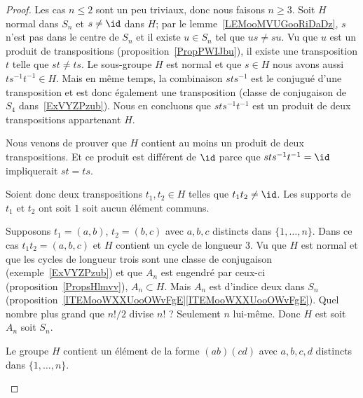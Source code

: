 \begin{proof}
    Les cas \( n\leq 2\) sont un peu triviaux, donc nous faisons \( n\geq 3\). Soit \( H\) normal dans \( S_n\) et \( s\neq \id\) dans \( H\); par le lemme~\ref{LEMooMVUGooRiDaDz}, \( s\) n'est pas dans le centre de \( S_n\) et il existe \( u\in S_n\) tel que \( us\neq su\). Vu que \( u\) est un produit de transpositions (proposition~\ref{PropPWIJbu}), il existe une transposition \( t\) telle que \( st\neq ts\). Le sous-groupe \( H\) est normal et que \( s\in H\) nous avons aussi \( ts^{-1}t^{-1}\in H\). Mais en même temps, la combinaison \( sts^{-1}\) est le conjugué d'une transposition et est donc également une transposition (classe de conjugaison de \( S_4\) dans~\ref{ExVYZPzub}). Nous en concluons que \( sts^{-1}t^{-1}\) est un produit de deux transpositions appartenant \( H\).

    Nous venons de prouver que \( H\) contient au moins un produit de deux transpositions. Et ce produit est différent de \( \id\) parce que \( sts^{-1}t^{-1}=\id\) impliquerait \( st=ts\).

    Soient donc deux transpositions \( t_1,t_2\in H\) telles que \( t_1t_2\neq \id\). Les supports de \( t_1\) et \( t_2\) ont soit \( 1\) soit aucun élément communs.

    \begin{subproof}
        \item[Premier cas]

            Supposons \( t_1=(a,b)\), \( t_2=(b,c)\) avec \( a,b,c\) distincts dans \( \{ 1,\ldots, n \}\). Dans ce cas \( t_1t_2=(a,b,c)\) et \( H\) contient un cycle de longueur \( 3\). Vu que \( H\) est normal et que les cycles de longueur trois sont une classe de conjugaison (exemple~\ref{ExVYZPzub}) et que \( A_n\) est engendré par ceux-ci (proposition~\ref{PropsHlmvv}), \( A_n\subset H\). Mais \( A_n\) est d'indice deux dans \( S_n\) (proposition~\ref{ITEMooWXXUooOWvFgE}\ref{ITEMooWXXUooOWvFgE}). Quel nombre plus grand que \( n!/2\) divise \( n!\) ? Seulement \( n\) lui-même. Donc \( H\) est soit \( A_n\) soit \( S_n\).

        \item[Second cas]

            Le groupe \( H\) contient un élément de la forme \( (ab)(cd)\) avec \( a,b,c,d\) distincts dans \( \{ 1,\ldots, n \}\).

            \begin{subproof}

                \item[Si \( n=3\)]


\end{subproof}
\end{subproof}
\end{proof}
